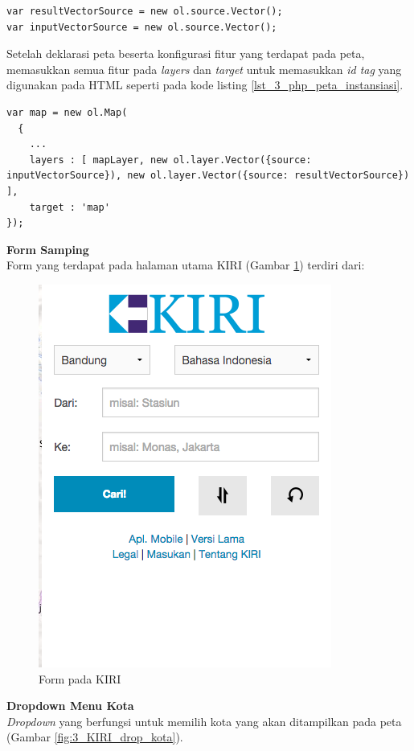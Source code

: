 \documentclass[a4paper,twoside]{article}
\begin{document}
\begin{enumerate}
\begin{lstlisting}[caption=Objek ol.source.Vector,label = {lst_3_php_peta_olvector}]
var resultVectorSource = new ol.source.Vector();
var inputVectorSource = new ol.source.Vector();
\end{lstlisting}

Setelah deklarasi peta beserta konfigurasi fitur yang terdapat pada peta, memasukkan semua fitur pada \textit{layers} dan \textit{target} untuk memasukkan \textit{id tag} yang digunakan pada HTML seperti pada kode listing \ref{lst_3_php_peta_instansiasi}.

\begin{lstlisting}[caption=Instansiasi peta,label = {lst_3_php_peta_instansiasi}]
var map = new ol.Map(
  {
    ...
    layers : [ mapLayer, new ol.layer.Vector({source: inputVectorSource}), new ol.layer.Vector({source: resultVectorSource}) ],
    target : 'map'
});
\end{lstlisting}

\textbf{Form Samping}\\
Form yang terdapat pada halaman utama KIRI (Gambar \ref{fig:3_KIRI_form}) terdiri dari:
\begin{figure}[H]
  \centering
  \includegraphics[scale=0.5]{Gambar/KIRI-form}
  \caption{Form pada KIRI} 
  \label{fig:3_KIRI_form}
\end{figure}

\textbf{Dropdown Menu Kota}\\
\textit{Dropdown} yang berfungsi untuk memilih kota yang akan ditampilkan pada peta (Gambar \ref{fig:3_KIRI_drop_kota}).


\end{enumerate}
\end{document}

